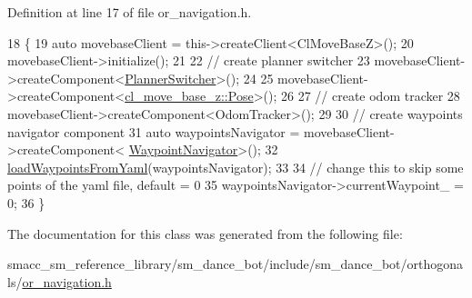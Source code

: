 Definition at line 17 of file or\+\_\+navigation.\+h.


\begin{DoxyCode}
18     \{
19         \textcolor{keyword}{auto} movebaseClient = this->createClient<ClMoveBaseZ>();
20         movebaseClient->initialize();
21 
22         \textcolor{comment}{// create planner switcher}
23         movebaseClient->createComponent<\hyperlink{classcl__move__base__z_1_1PlannerSwitcher}{PlannerSwitcher}>();
24 
25         movebaseClient->createComponent<\hyperlink{classcl__move__base__z_1_1Pose}{cl\_move\_base\_z::Pose}>();
26 
27         \textcolor{comment}{// create odom tracker}
28         movebaseClient->createComponent<OdomTracker>();
29 
30         \textcolor{comment}{// create waypoints navigator component}
31         \textcolor{keyword}{auto} waypointsNavigator = movebaseClient->createComponent<
      \hyperlink{classcl__move__base__z_1_1WaypointNavigator}{WaypointNavigator}>();
32         \hyperlink{classsm__dance__bot_1_1OrNavigation_a1f092ffe3a1b29ae9ea6623aff00ab16}{loadWaypointsFromYaml}(waypointsNavigator);
33 
34         \textcolor{comment}{// change this to skip some points of the yaml file, default = 0}
35         waypointsNavigator->currentWaypoint\_ = 0;
36     \}
\end{DoxyCode}


The documentation for this class was generated from the following file\+:\begin{DoxyCompactItemize}
\item 
smacc\+\_\+sm\+\_\+reference\+\_\+library/sm\+\_\+dance\+\_\+bot/include/sm\+\_\+dance\+\_\+bot/orthogonals/\hyperlink{sm__dance__bot_2include_2sm__dance__bot_2orthogonals_2or__navigation_8h}{or\+\_\+navigation.\+h}\end{DoxyCompactItemize}
